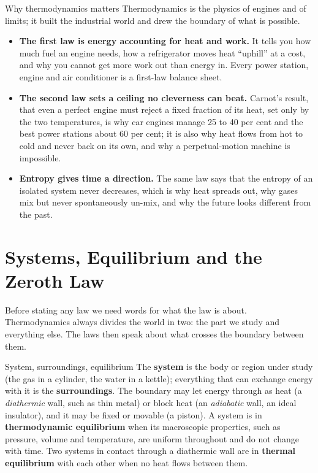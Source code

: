 \begin{motivbox}{Why thermodynamics matters}
Thermodynamics is the physics of engines and of limits; it built the industrial world and drew the
boundary of what is possible.
\begin{itemize}
\item \textbf{The first law is energy accounting for heat and work.} It tells you how much fuel an engine
needs, how a refrigerator moves heat ``uphill'' at a cost, and why you cannot get more work out than
energy in. Every power station, engine and air conditioner is a first-law balance sheet.
\item \textbf{The second law sets a ceiling no cleverness can beat.} Carnot's result, that even a perfect
engine must reject a fixed fraction of its heat, set only by the two temperatures, is why car engines
manage 25 to 40 per cent and the best power stations about 60 per cent; it is also why heat flows from
hot to cold and never back on its own, and why a perpetual-motion machine is impossible.
\item \textbf{Entropy gives time a direction.} The same law says that the entropy of an isolated system
never decreases, which is why heat spreads out, why gases mix but never spontaneously un-mix, and why
the future looks different from the past.
\end{itemize}
\end{motivbox}

\section{Systems, Equilibrium and the Zeroth Law}\label{sec:thermo-zeroth}

Before stating any law we need words for what the law is about. Thermodynamics always divides the world
in two: the part we study and everything else. The laws then speak about what crosses the boundary
between them.

\begin{defbox}{System, surroundings, equilibrium}
The \textbf{system} is the body or region under study (the gas in a cylinder, the water in a kettle);
everything that can exchange energy with it is the \textbf{surroundings}. The boundary may let energy
through as heat (a \emph{diathermic} wall, such as thin metal) or block heat (an \emph{adiabatic} wall,
an ideal insulator), and it may be fixed or movable (a piston). A system is in \textbf{thermodynamic
equilibrium} when its macroscopic properties, such as pressure, volume and temperature, are uniform
throughout and do not change with time. Two systems in contact through a diathermic wall are in
\textbf{thermal equilibrium} with each other when no heat flows between them.
\end{defbox}

